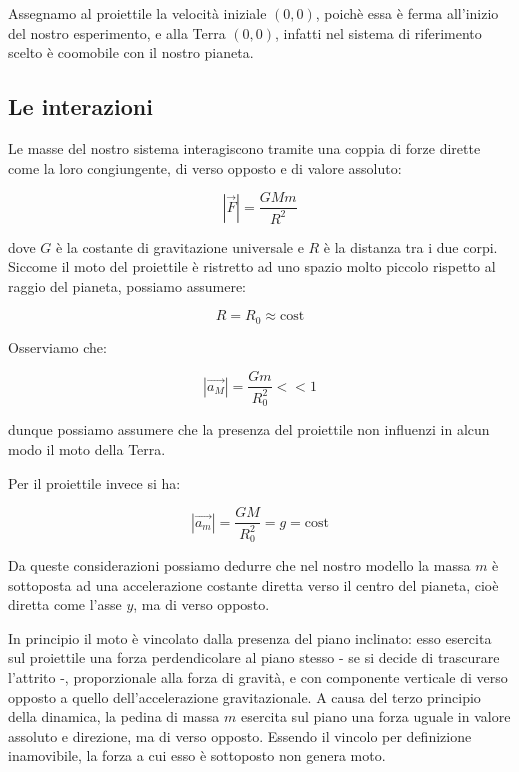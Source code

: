 \documentclass{article}
\begin{document}
Assegnamo al proiettile la velocità iniziale $(0,0)$, poichè essa è ferma
all'inizio del nostro esperimento, e alla Terra $(0,0)$, infatti
nel sistema di riferimento scelto è coomobile con il nostro pianeta.

\subsection{Le interazioni}
Le masse del nostro sistema interagiscono tramite una coppia di forze dirette
come la loro congiungente, di verso opposto e di valore assoluto:

\begin{equation}
|\vec{F}| = \frac{G M m}{R^2}
\end{equation}

dove $G$ è la costante di gravitazione universale e $R$ è la distanza tra i due
corpi. Siccome il moto del proiettile è ristretto ad uno spazio
molto piccolo rispetto al raggio del pianeta, possiamo assumere:

\begin{equation}
R = R_0 \approx \mbox{cost}
\end{equation}

Osserviamo che:

\begin{equation}
|\vec{a_M}| = \frac{Gm}{R_0^2} << 1
\end{equation}

dunque possiamo assumere che la presenza del proiettile non influenzi in alcun
modo il moto della Terra.

Per il proiettile invece si ha:

\begin{equation}
|\vec{a_m}| = \frac{GM}{R_0^2} = g = \mbox{cost}
\end{equation}

Da queste considerazioni possiamo dedurre che nel nostro modello
la massa $m$ è sottoposta ad una accelerazione costante
diretta verso il centro del pianeta, cioè diretta come l'asse $y$,
ma di verso opposto.

In principio il moto è vincolato dalla presenza del piano inclinato:
esso esercita sul proiettile una forza perdendicolare al piano stesso
- se si decide di trascurare l'attrito -, proporzionale alla forza di
gravità, e con componente verticale di verso opposto a quello
dell'accelerazione gravitazionale. A causa del terzo principio della
dinamica, la pedina di massa $m$ esercita sul piano una forza uguale in
valore assoluto e direzione, ma di verso opposto. Essendo il vincolo
per definizione inamovibile, la forza a cui esso è sottoposto non genera
moto.
\end{document}
